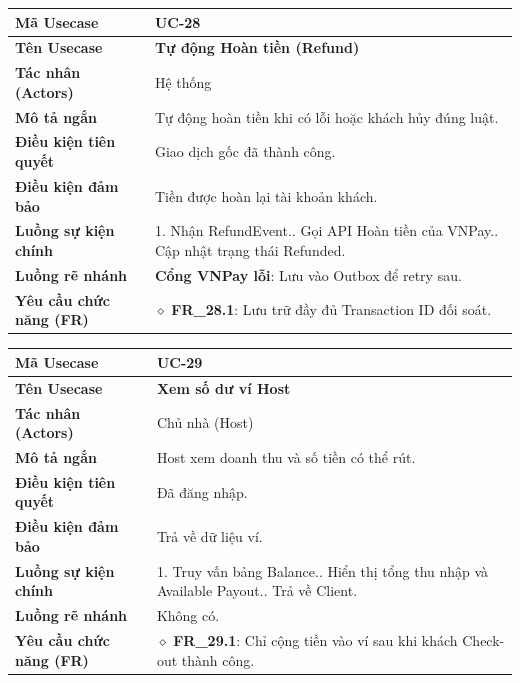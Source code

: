 \begin{table}[H]
\renewcommand{\arraystretch}{1.3}
\centering
\begin{tabularx}{\textwidth}{|p{4.5cm}|X|}
\hline
\cellcolor{gray!15}\bfseries Mã Usecase & \textbf{UC-28} \\ \hline
\cellcolor{gray!15}\bfseries Tên Usecase & \textbf{Tự động Hoàn tiền (Refund)} \\ \hline
\cellcolor{gray!15}\bfseries Tác nhân (Actors) & Hệ thống \\ \hline
\cellcolor{gray!15}\bfseries Mô tả ngắn & Tự động hoàn tiền khi có lỗi hoặc khách hủy đúng luật. \\ \hline
\cellcolor{gray!15}\bfseries Điều kiện tiên quyết & Giao dịch gốc đã thành công. \\ \hline
\cellcolor{gray!15}\bfseries Điều kiện đảm bảo & Tiền được hoàn lại tài khoản khách. \\ \hline
\cellcolor{gray!15}\bfseries Luồng sự kiện chính & 1. Nhận RefundEvent.\newline 2. Gọi API Hoàn tiền của VNPay.\newline 3. Cập nhật trạng thái Refunded. \\ \hline
\cellcolor{gray!15}\bfseries Luồng rẽ nhánh & \textbf{Cổng VNPay lỗi}: Lưu vào Outbox để retry sau. \\ \hline
\cellcolor{gray!15}\bfseries Yêu cầu chức năng (FR) & $\diamond$ \textbf{FR\_28.1}: Lưu trữ đầy đủ Transaction ID đối soát. \\ \hline
\end{tabularx}
\end{table}

\begin{table}[H]
\renewcommand{\arraystretch}{1.3}
\centering
\begin{tabularx}{\textwidth}{|p{4.5cm}|X|}
\hline
\cellcolor{gray!15}\bfseries Mã Usecase & \textbf{UC-29} \\ \hline
\cellcolor{gray!15}\bfseries Tên Usecase & \textbf{Xem số dư ví Host} \\ \hline
\cellcolor{gray!15}\bfseries Tác nhân (Actors) & Chủ nhà (Host) \\ \hline
\cellcolor{gray!15}\bfseries Mô tả ngắn & Host xem doanh thu và số tiền có thể rút. \\ \hline
\cellcolor{gray!15}\bfseries Điều kiện tiên quyết & Đã đăng nhập. \\ \hline
\cellcolor{gray!15}\bfseries Điều kiện đảm bảo & Trả về dữ liệu ví. \\ \hline
\cellcolor{gray!15}\bfseries Luồng sự kiện chính & 1. Truy vấn bảng Balance.\newline 2. Hiển thị tổng thu nhập và Available Payout.\newline 3. Trả về Client. \\ \hline
\cellcolor{gray!15}\bfseries Luồng rẽ nhánh & Không có. \\ \hline
\cellcolor{gray!15}\bfseries Yêu cầu chức năng (FR) & $\diamond$ \textbf{FR\_29.1}: Chỉ cộng tiền vào ví sau khi khách Check-out thành công. \\ \hline
\end{tabularx}
\end{table}


